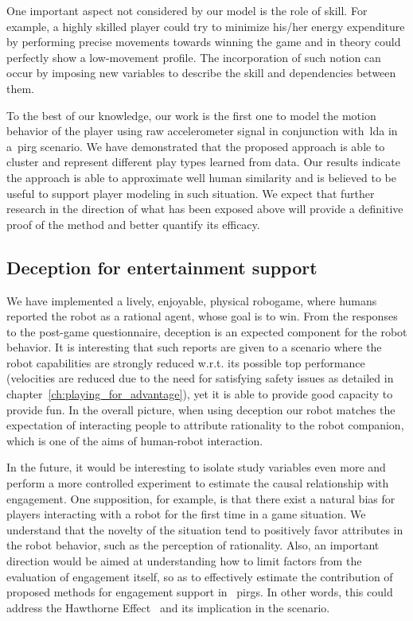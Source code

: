 One important aspect not considered by our model is the role of skill. For example, a highly skilled player could try to minimize his/her energy expenditure by performing precise movements towards winning the game and in theory could perfectly show a low-movement profile.  The incorporation of such notion can occur by imposing new variables to describe the skill and dependencies between them. 

To the best of our knowledge, our work is the first one to model the motion behavior of the player using raw accelerometer signal in conjunction with~\gls{lda} in a~\gls{pirg} scenario. We have demonstrated that the proposed approach is able to cluster and represent different play types learned from data. Our results indicate the approach is able to approximate well human similarity and is believed to be useful to support player modeling in such situation. We expect that further research in the direction of what has been exposed above will provide a definitive proof of the method and better quantify its efficacy. 

\subsection{Deception for entertainment support}
We have implemented a lively, enjoyable, physical robogame, where humans reported the robot as a rational agent, whose goal is to win. From the responses to the post-game questionnaire, deception is an expected component for the robot behavior. It is interesting that such reports are given to a scenario where the robot capabilities are strongly reduced w.r.t. its possible top performance (\eg velocities are reduced due to the need for satisfying safety issues as detailed in chapter~\ref{ch:playing_for_advantage}), yet it is able to provide good capacity to provide fun. In the overall picture, when using deception our robot matches the expectation of interacting people to attribute rationality to the robot companion, which is one of the aims of human-robot interaction.

In the future, it would be interesting to isolate study variables even more and perform a more controlled experiment to estimate the causal relationship with engagement. One supposition, for example, is that there exist a natural bias for players interacting with a robot for the first time in a game situation. We understand that the novelty of the situation tend to positively favor attributes in the robot behavior, such as the perception of rationality. Also, an important direction would be aimed at understanding how to limit factors from the evaluation of engagement itself, so as to effectively estimate the contribution of proposed methods for engagement support in ~\gls{pirg}s. In other words, this could address the Hawthorne Effect~\citep{jones_was_1992} and its implication in the scenario.

